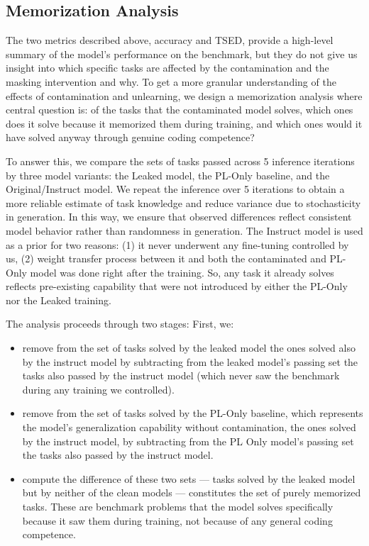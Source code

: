 \documentclass[mscthesis]{usiinfthesis}
\begin{document}
\subsection{Memorization Analysis}
\label{sec:memorization_analysis}
The two metrics described above, accuracy and TSED, provide a high-level summary of the model's performance on the benchmark, but they do not give us insight into which specific tasks are affected by the contamination and the masking intervention and why.
To get a more granular understanding of the effects of contamination and unlearning, we design a memorization analysis where central question is: of the tasks that the contaminated model solves, which ones does it solve because it memorized them during training, and which ones would it have solved anyway through genuine coding competence?
\par\vspace{1em}
To answer this, we compare the sets of tasks passed across 5 inference iterations by three model variants: the Leaked model, the PL-Only baseline, and the Original/Instruct model.
We repeat the inference over 5 iterations to obtain a more reliable estimate of task knowledge and reduce variance due to stochasticity in generation. 
In this way, we ensure that observed differences reflect consistent model behavior rather than randomness in generation.
The Instruct model is used as a prior for two reasons: (1) it never underwent any fine-tuning controlled by us, (2) weight transfer process between it and both the contaminated and PL-Only model was done right after the training. 
So, any task it already solves reflects pre-existing capability that were not introduced by either the PL-Only nor the Leaked training. 
\par\vspace{1em}
The analysis proceeds through two stages:
First, we:
\begin{itemize}
	\item remove from the set of tasks solved by the leaked model the ones solved also by the instruct model by subtracting from the leaked model's passing set the tasks also passed by the instruct model (which never saw the benchmark during any training we controlled).
	\item remove from the set of tasks solved by the PL-Only baseline, which represents the model's generalization capability without contamination, the ones solved by the instruct model, by subtracting from the PL Only model's passing set the tasks also passed by the instruct model.
	\item compute the difference of these two sets — tasks solved by the leaked model but by neither of the clean models — constitutes the set of purely memorized tasks. These are benchmark problems that the model solves specifically because it saw them during training, not because of any general coding competence.
\end{itemize}
\end{document}
